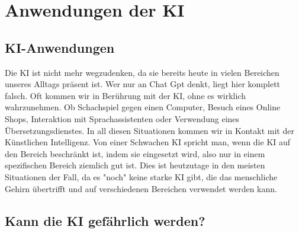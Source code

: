 \chapter{Anwendungen der KI}
\label{chap:Anwendungen}

\section{KI-Anwendungen}
Die KI ist nicht mehr wegzudenken, da sie bereits heute in vielen Bereichen unseres Alltags präsent ist. Wer nur an Chat Gpt denkt, liegt hier komplett falsch. Oft kommen wir in Berührung mit der KI, ohne es wirklich wahrzunehmen. Ob Schachspiel gegen einen Computer, Besuch eines Online Shops, Interaktion mit Sprachassistenten oder Verwendung eines Übersetzungsdienstes. In all diesen Situationen kommen wir in Kontakt mit der Künstlichen Intelligenz. Von einer Schwachen KI spricht man, wenn die KI auf den Bereich beschränkt ist, indem sie eingesetzt wird, also nur in einem spezifischen Bereich ziemlich gut ist. Dies ist heutzutage in den meisten Situationen der Fall, da es "noch" keine starke KI gibt, die das menschliche Gehirn übertrifft und auf verschiedenen Bereichen verwendet werden kann.

\section{Kann die KI gefährlich werden?}

